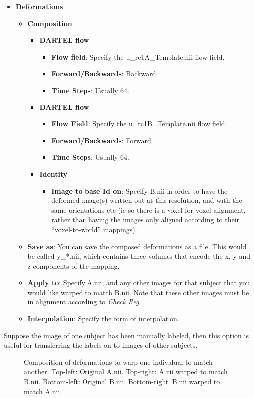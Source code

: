 \begin{itemize}
\item{{\bf Deformations}
  \begin{itemize}
  \item{{\bf Composition}
    \begin{itemize}
    \item{{\bf DARTEL flow}
      \begin{itemize}
      \item{{\bf Flow field}: Specify the u\_rc1A\_Template.nii flow field.}
      \item{{\bf Forward/Backwards}: Backward.}
      \item{{\bf Time Steps}: Usually 64.}
      \end{itemize}
    }
    \item{{\bf DARTEL flow}
      \begin{itemize}
      \item{{\bf Flow Field}: Specify the u\_rc1B\_Template.nii flow field.}
      \item{{\bf Forward/Backwards}: Forward.}
      \item{{\bf Time Steps}: Usually 64.}
      \end{itemize}
    }
    \item{{\bf Identity}
      \begin{itemize}
      \item{{\bf Image to base Id on}: Specify B.nii in order to have the deformed image(s) written out at this resolution, and with the same orientations etc (ie so there is a voxel-for-voxel alignment, rather than having the images only aligned according to their ``voxel-to-world'' mappings).}
      \end{itemize}
    }
    \end{itemize}
  }
  \item{{\bf Save as}: You can save the composed deformations as a file. This would be called y\_*.nii, which contains three volumes that encode the x, y and z components of the mapping.}
  \item{{\bf Apply to}: Specify A.nii, and any other images for that subject that you would like warped to match B.nii. Note that these other images must be in alignment according to \emph{Check Reg}.}
  \item{{\bf Interpolation}: Specify the form of interpolation.}
  \end{itemize}
}
\end{itemize}

Suppose the image of one subject has been manually labeled, then this option is useful for transferring the labels on to images of other subjects.

\begin{figure}
\begin{center}
\end{center}
\caption{
Composition of deformations to warp one individual to match another.
Top-left: Original A.nii.
Top-right: A.nii warped to match B.nii.
Bottom-left: Original B.nii.
Bottom-right: B.nii warped to match A.nii.
\label{Fig:AtoB}}
\end{figure}


